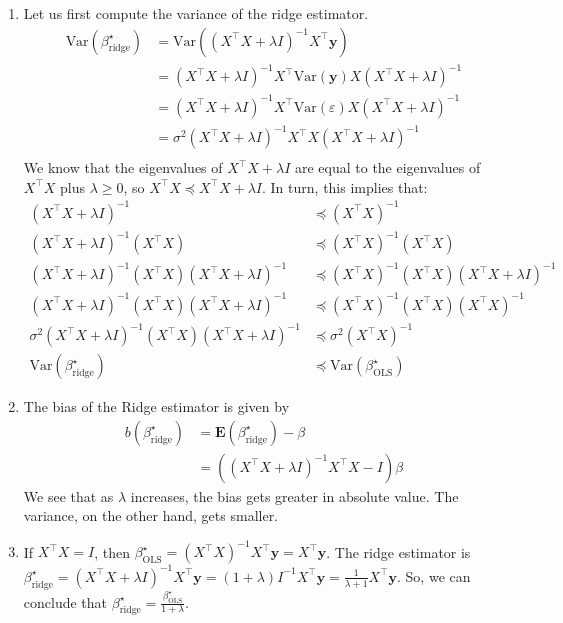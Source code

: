 \documentclass{article}
\begin{document}
\begin{enumerate}
        \item Let us first compute the variance of the ridge estimator.
        \begin{align*}
            \text{Var}(\beta^\star_{\text{ridge}}) &= \mathrm{Var}({(X^\top X + \lambda I)}^{-1} X^\top \mathbf{y}) \\
            &= {(X^\top X + \lambda I)}^{-1} X^\top \mathrm{Var}(\mathbf{y}) X {(X^\top X + \lambda I)}^{-1} \\
            &= {(X^\top X + \lambda I)}^{-1} X^\top \mathrm{Var}(\varepsilon) X {(X^\top X + \lambda I)}^{-1} \\
            &= \sigma^2 {(X^\top X + \lambda I)}^{-1} X^\top X {(X^\top X + \lambda I)}^{-1} \\
        \end{align*}
        We know that the eigenvalues of $X^\top X + \lambda I$ are equal to the eigenvalues of $X^\top X$ plus $\lambda \geq 0$, so $X^\top X \preccurlyeq X^\top X + \lambda I$. In turn, this implies that:
        \begin{align*}
            {(X^\top X + \lambda I)}^{-1} &\preccurlyeq {(X^\top X)}^{-1} \\
            {(X^\top X + \lambda I)}^{-1} (X^\top X) &\preccurlyeq {(X^\top X)}^{-1} (X^\top X) \\
            {(X^\top X + \lambda I)}^{-1} (X^\top X) {(X^\top X + \lambda I)}^{-1} &\preccurlyeq {(X^\top X)}^{-1} (X^\top X) {(X^\top X + \lambda I)}^{-1} \\
            {(X^\top X + \lambda I)}^{-1} (X^\top X) {(X^\top X + \lambda I)}^{-1} &\preccurlyeq {(X^\top X)}^{-1} (X^\top X) {(X^\top X)}^{-1} \\
            \sigma^2 {(X^\top X + \lambda I)}^{-1} (X^\top X) {(X^\top X + \lambda I)}^{-1} &\preccurlyeq \sigma^2 {(X^\top X)}^{-1} \\
            \mathrm{Var}(\beta^\star_{\text{ridge}}) &\preccurlyeq \mathrm{Var}(\beta^\star_{\text{OLS}})
        \end{align*}

        \item  The bias of the Ridge estimator is given by
        \begin{align*}
            b(\beta^\star_{\text{ridge}}) &= \mathbf{E}(\beta^\star_{\text{ridge}}) - \beta \\
            &= ({(X^\top X + \lambda I)}^{-1} X^\top X - I) \beta
        \end{align*}
        We see that as $\lambda$ increases, the bias gets greater in absolute value. The variance, on the other hand, gets smaller.

        \item If $X^\top X = I$, then $\beta^\star_{\text{OLS}} = {(X^\top X)}^{-1} X^\top \mathbf{y} = X^\top \mathbf{y}$. The ridge estimator is $\beta^\star_{\text{ridge}} = {(X^\top X + \lambda I)}^{-1} X^\top \mathbf{y} = {(1 + \lambda) I}^{-1} X^\top \mathbf{y} = \frac{1}{\lambda + 1} X^\top \mathbf{y}$. So, we can conclude that $\beta^\star_{\text{ridge}} = \frac{\beta^\star_{\text{OLS}}}{1+\lambda}$.
    \end{enumerate}
\end{document}
